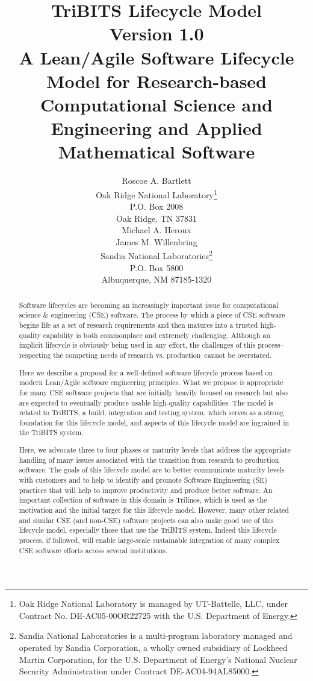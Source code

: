 \documentclass[11pt]{SANDreport}
\title{
TriBITS Lifecycle Model \\[2ex] Version 1.0 \\[2ex] \large A
Lean/Agile Software Lifecycle Model for Research-based Computational
Science and Engineering and Applied Mathematical Software }
\author{
Roscoe A. Bartlett \\ Oak Ridge National Laboratory\footnote{Oak Ridge National Laboratory is managed by UT-Battelle, LLC, under Contract No. DE-AC05-00OR22725 with the U.S. Department of Energy.} \\ P.O. Box 2008 \\ Oak Ridge, TN 37831
\\[2ex] Michael A. Heroux \\ James M. Willenbring \\ Sandia National Laboratories\footnote{Sandia National Laboratories is a  multi-program laboratory managed and operated by Sandia Corporation,  a wholly owned subsidiary of Lockheed Martin Corporation, for the U.S. Department of Energy’s National Nuclear Security Administration under Contract DE-AC04-94AL85000.} \\ P.O. Box 5800 \\ Albuquerque, NM 87185-1320 \\
}
\date{}
\begin{document}

\maketitle

%

%
\begin{abstract}
%

Software lifecycles are becoming an increasingly important issue for computational science \& engineering (CSE) software.  The process by which a piece of CSE software begins life as a set of research requirements and then matures into a trusted high-quality capability is both commonplace and extremely challenging.  Although an implicit lifecycle is obviously being used in any effort, the challenges of this process--respecting the competing needs of research vs. production--cannot be overstated.

Here we describe a proposal for a well-defined software lifecycle process based on modern Lean/Agile software engineering principles. What we propose is appropriate for many CSE software projects that are initially heavily focused on research but also are expected to eventually produce usable high-quality capabilities.  The model is related to TriBITS, a build, integration and testing system, which serves as a strong foundation for this lifecycle model, and aspects of this lifecycle model are ingrained in the TriBITS system.

Here, we advocate three to four phases or maturity levels that address the appropriate handling of many issues associated with the transition from research to production software.  The goals of this lifecycle model are to better communicate maturity levels with customers and to help to identify and promote Software Engineering (SE) practices that will help to improve productivity and produce better software.  An important collection of software in this domain is Trilinos, which is used as the motivation and the initial target for this lifecycle model.  However, many other related and similar CSE (and non-CSE) software projects can also make good use of this lifecycle model, especially those that use the TriBITS system.  Indeed this lifecycle process, if followed, will enable large-scale sustainable integration of many complex CSE software efforts across several institutions.

%
\end{abstract}
%
\end{document}
